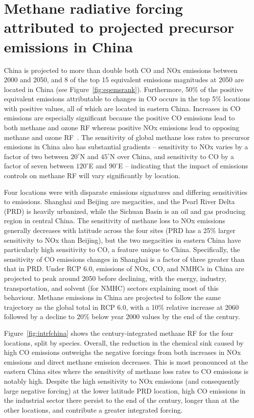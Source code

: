 \section{Methane radiative forcing attributed to projected precursor emissions in China}
\label{sec:china}
China is projected to more than double both CO and NOx emissions between 2000 and 2050, and 8 of the top 15 equivalent emissions magnitudes at 2050 are located in China (see Figure~\ref{fig:eqemsrank}). Furthermore, 50\% of the positive equivalent emissions attributable to changes in CO occurs in the top 5\% locations with positive values, all of which are located in eastern China. Increases in CO emissions are especially significant because the positive CO emissions lead to both methane and ozone RF whereas positive NOx emissions lead to opposing methane and ozone RF~\citep{ref:myhre2013}. The sensitivity of global methane loss rates to precursor emissions in China also has substantial gradients -- sensitivity to NOx varies by a factor of two between $20^{\circ}$N and $45^{\circ}$N over China, and sensitivity to CO by a factor of seven between $120^{\circ}$E and $90^{\circ}$E -- indicating that the impact of emissions controls on methane RF will vary significantly by location.

Four locations were with disparate emissions signatures and differing sensitivities to emissions. Shanghai and Beijing are megacities, and the Pearl River Delta (PRD) is heavily urbanized, while the Sichuan Basin is an oil and gas producing region in central China. The sensitivity of methane loss to NOx emissions generally decreases with latitude across the four sites (PRD has a 25\% larger sensitivity to NOx than Beijing), but the two megacities in eastern China have particularly high sensitivity to CO, a feature unique to China. Specifically, the sensitivity of CO emissions changes in Shanghai is a factor of three greater than that in PRD. Under RCP 6.0, emissions of NOx, CO, and NMHCs in China are projected to peak around 2050 before declining, with the energy, industry, transportation, and solvent (for NMHC) sectors explaining most of this behaviour. Methane emissions in China are projected to follow the same trajectory as the global total in RCP 6.0, with a 10\% relative increase at 2060 followed by a decline to 20\% below year 2000 values by the end of the century.

Figure~\ref{fig:intrfchina} shows the century-integrated methane RF for the four locations, split by species. Overall, the reduction in the chemical sink caused by high CO emissions outweighs the negative forcings from both increases in NOx emissions and direct methane emission decreases. This is most pronounced at the eastern China sites where the sensitivity of methane loss rates to CO emissions is notably high. Despite the high sensitivity to NOx emissions (and consequently large negative forcing) at the lower latitude PRD location, high CO emissions in the industrial sector there persist to the end of the century, longer than at the other locations, and contribute a greater integrated forcing.